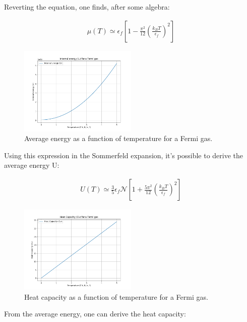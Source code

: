 \documentclass{article}
\begin{document}
Reverting the equation, one finds, after some algebra:

\begin{tcolorbox}[colframe=gray!50, colback=gray!10, coltitle=black, title= $\mu(T>0)$]

    \begin{equation}
        \begin{aligned}
            \mu(T)\simeq \epsilon_f\left[1-\frac{\pi^2}{12}\left(\frac{k_BT}{\epsilon_f}\right)^2\right]
        \end{aligned}
    \end{equation}
\end{tcolorbox}


\begin{figure}[h]
    \centering
    \includegraphics[width=0.5\textwidth]{images/statistical-physics/u-fermions.png}
    \caption{Average energy as a function of temperature for a Fermi gas.}
    \label{fig:u-fermions}
\end{figure}

Using this expression in the Sommerfeld expansion, it's possible to derive the average energy U:

\begin{tcolorbox}[colframe=gray!50, colback=gray!10, coltitle=black, title= $U(T>0)$]

    \begin{equation}
        \begin{aligned}
            U(T)\simeq \frac{3}{5}\epsilon_f\mathcal{N}\left[1+\frac{5\pi^2}{12}\left(\frac{k_BT}{\epsilon_f}\right)^2\right]
        \end{aligned}
    \end{equation}

\end{tcolorbox}

\begin{figure}[h]
    \centering
    \includegraphics[width=0.5\textwidth]{images/statistical-physics/cv-fermions.png}
    \caption{Heat capacity as a function of temperature for a Fermi gas.}
    \label{fig:fermions-heat-capacity}
\end{figure}
From the average energy, one can derive the heat capacity:
\end{document}
